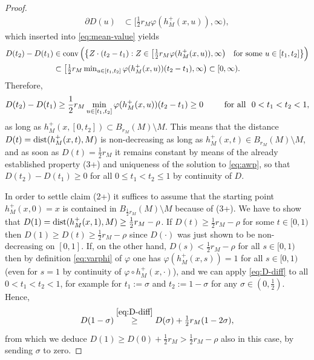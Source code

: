 \begin{proof}
\begin{align}
\partial D(u) & %
 \subset \big[\tfrac12 r_M\varphi(h_M^+(x,u)),\infty\big),\label{eq:clarke-gradient-D}
\end{align}
which inserted into \eqref{eq:mean-value} yields
\begin{align*}
D(t_2)-D(t_1)&\in\operatorname{conv}\Big(\big\{Z\cdot (t_2-t_1):Z\in \big[\textstyle\frac12 r_M\varphi
(h_M^+(x,u)),\infty\big)\quad\textnormal{for some $u\in [t_1,t_2]$}\big\}\Big)\\
& \subset \big[\textstyle\frac12 r_M\min_{u\in [t_1,t_2]}\varphi(h_M^+(x,u))(t_2-t_1),
\infty
\big)\subset [0,\infty).
\end{align*}
Therefore, 
\begin{equation}\label{eq:D-diff}
D(t_2)-D(t_1)\ge \frac12 r_M\min_{u\in [t_1,t_2]}\varphi(h_M^+(x,u))(t_2-t_1)
\ge 0\qquad
\,\,\,\text{for all }\,\, 0<t_1<t_2<1,
\end{equation}
as long as $h_M^+(x,[0,t_2])\subset B_{r_M}(M)\setminus M$. 
This means that the distance $D(t)=\operatorname{dist}(h_M^+(x,t),M)$ is non-decreasing as long
as $h_M^+(x,t)\in B_{r_M}(M)\setminus M$, and as soon as
$D(t)=\frac12{r_M}$ it remains constant by means of the already established
property 
(3+) and uniqueness of the solution to \eqref{eq:awp}, 
so that $D(t_2)-D(t_1)\ge 0$ for all $0\le t_1<t_2\le 1$
by continuity of $D$.

In order to settle claim (2+) it suffices to assume that the starting point
$h_M^+(x,0)=x$ is contained in $B_{\frac12{r_M}}(M)\setminus M$ because of (3+).
We have to show that $D(1)=\operatorname{dist}(h_M^+(x,1),M)\ge\frac12{r_M}-\rho$.
If $D(t)\ge \frac12{r_M}-\rho$ for some $t\in [0,1)$ then $D(1)\ge D(t)\ge
\frac12{r_M}-\rho$ since $D(\cdot)$ was just shown to be non-decreasing
on $[0,1]$. If, on the other hand, $D(s)<\frac12{r_M}-\rho$ for all $s\in [0,1)$ then
by definition \eqref{eq:varphi} of $\varphi$ one has $\varphi(h_M^+(x,s))=1$
for all $s\in [0,1)$ (even for $s=1$ by continuity of $\varphi\circ h_M^+(x,\cdot)$),
and we can apply \eqref{eq:D-diff} to all $0<t_1<t_2<1$, for example
for $t_1:=\sigma$ and $t_2:=1-\sigma$ for any $\sigma\in (0,\frac12).$
Hence,
$$
\textstyle
D(1-\sigma)\overset{\eqref{eq:D-diff}}{\ge} D(\sigma)+\frac12 r_M(1-2\sigma),
$$
from which we deduce $D(1)\ge D(0)+\frac12 r_M>\frac12 r_M-\rho$ also in this
case, by sending $\sigma$ to zero.
\end{proof}
